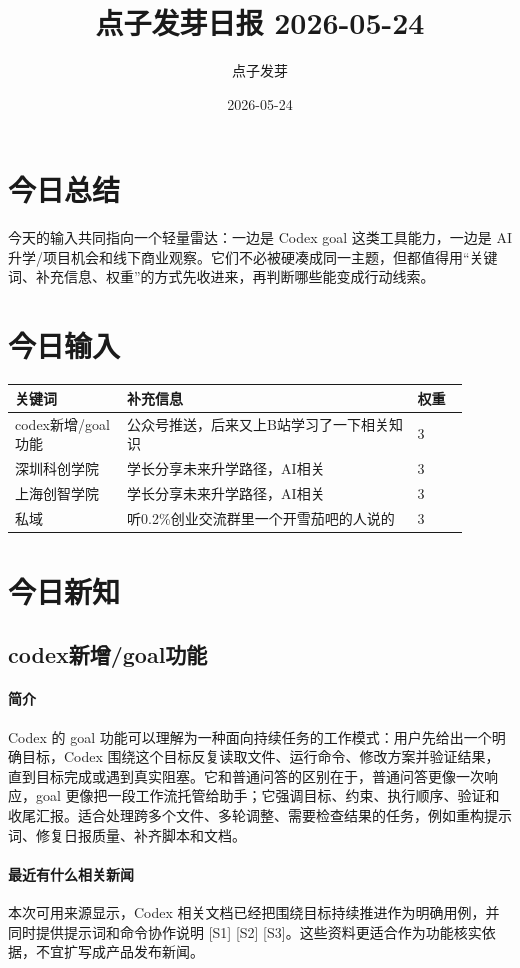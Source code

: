 \documentclass[UTF8,zihao=-4]{ctexart}
\title{\bfseries 点子发芽日报 2026-05-24}
\author{点子发芽}
\date{2026-05-24}
\begin{document}
\maketitle
\section*{今日总结}
今天的输入共同指向一个轻量雷达：一边是 Codex goal 这类工具能力，一边是 AI 升学/项目机会和线下商业观察。它们不必被硬凑成同一主题，但都值得用“关键词、补充信息、权重”的方式先收进来，再判断哪些能变成行动线索。
\section*{今日输入}
\begin{longtable}{|p{0.22\linewidth}|p{0.58\linewidth}|p{0.10\linewidth}|}
\hline
\textbf{关键词} & \textbf{补充信息} & \textbf{权重} \\
\hline
codex新增/goal功能 & 公众号推送，后来又上B站学习了一下相关知识 & 3 \\
\hline
深圳科创学院 & 学长分享未来升学路径，AI相关 & 3 \\
\hline
上海创智学院 & 学长分享未来升学路径，AI相关 & 3 \\
\hline
私域 & 听0.2\%创业交流群里一个开雪茄吧的人说的 & 3 \\
\hline
\end{longtable}
\section*{今日新知}
\subsection*{codex新增/goal功能}
\paragraph{简介} Codex 的 goal 功能可以理解为一种面向持续任务的工作模式：用户先给出一个明确目标，Codex 围绕这个目标反复读取文件、运行命令、修改方案并验证结果，直到目标完成或遇到真实阻塞。它和普通问答的区别在于，普通问答更像一次响应，goal 更像把一段工作流托管给助手；它强调目标、约束、执行顺序、验证和收尾汇报。适合处理跨多个文件、多轮调整、需要检查结果的任务，例如重构提示词、修复日报质量、补齐脚本和文档。
\paragraph{最近有什么相关新闻} 本次可用来源显示，Codex 相关文档已经把围绕目标持续推进作为明确用例，并同时提供提示词和命令协作说明 [S1] [S2] [S3]。这些资料更适合作为功能核实依据，不宜扩写成产品发布新闻。
\end{document}

